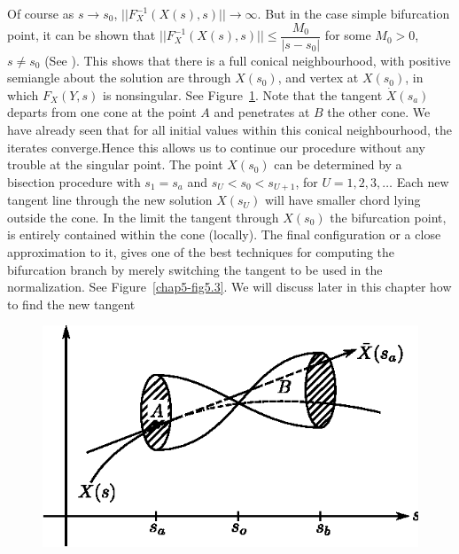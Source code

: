 Of course as $s \to s_0$, $||F^{-1}_X(X(s),s)|| \to \infty$. But in the
case simple bifurcation point, it can be shown that
$||F^{-1}_X(X(s),s)||\le \dfrac{M_0}{|s-s_0|}$ for some $M_0 >0$, $s
\neq s_0$ (See \cite{key6}). This shows that there is a full conical
neighbourhood,\pageoriginale 
with positive semiangle  about the solution are through
$X(s_0)$, and vertex at $X(s_0)$, in which $F_X (Y,s)$ is
nonsingular. See Figure~\ref{chap5-fig5.2}. 
Note that the tangent $\dot{X}(s_a)$ departs
from one cone at the point $A$ and penetrates at $B$ the other
cone. We have already seen that for all initial values within this
conical neighbourhood, the iterates converge.Hence this allows us to
continue our procedure without any trouble at the singular point. The
point $X(s_0)$ can be determined by a bisection procedure with $s_1 = s_a$
and $s_U < s_0 < s_{U+1}$, for $U= 1,2,3, \ldots$ Each new tangent line
through the new solution $X(s_U)$ will have smaller chord lying
outside the cone. In the limit the tangent through $X(s_0)$ the
bifurcation point, is entirely contained within the cone
(locally). The final configuration or a close approximation to it,
gives one of the best techniques for computing the bifurcation branch
by merely switching the tangent to be used in the normalization. See
Figure~\ref{chap5-fig5.3}. 
We will discuss later in this chapter how to find the new
tangent 
\begin{figure}[H]
\centering
\includegraphics{vol79-fig/fig79-26.eps}
\smallskip
\caption{}
\label{chap5-fig5.2}
\end{figure}
